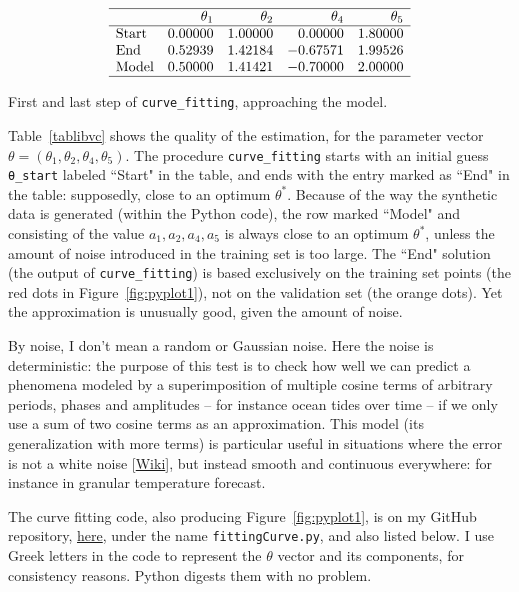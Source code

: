 \documentclass[oneside,10pt]{book}
\renewcommand{\arraystretch}{1.4} %
\begin{document}
\renewcommand{\arraystretch}{1.2} %
\begin{table}[H]
\[
\begin{array}{lrrrr}
\hline
   & \theta_1 & \theta_2  & \theta_4 & \theta_5  \\
\hline
\text{Start}	&	0.00000	&	1.00000	& 0.00000	 &  1.80000\\
\text{End}	&	0.52939	&	1.42184	&-0.67571	 &  1.99526\\
\text{Model}	&	0.50000	&	1.41421	& -0.70000	 & 2.00000  \\
\hline
\end{array}
\]
\caption{\label{tablibvc} First and last step of \texttt{curve\_fitting}, approaching the model.}
\end{table}
\renewcommand{\arraystretch}{1.0} %

Table~\ref{tablibvc} shows the quality of the estimation, for the parameter vector $\theta=(\theta_1,\theta_2,\theta_4,\theta_5)$.
The procedure \texttt{curve\_fitting} starts with an initial guess \texttt{\textcolor{gray2}{θ}\_start} labeled ``Start" in the table, and
 ends  with the entry marked as ``End" in the table: supposedly, close to an optimum $\theta^*$. Because of the way the   \textcolor{index}{synthetic data} is generated (within the Python code), the row marked ``Model" and consisting of the value
 $a_1,a_2,a_4,a_5$ is always close to an optimum $\theta^*$,
 unless the amount of noise introduced in the training set is too large. The ``End" solution (the output of
 \texttt{curve\_fitting}) is based exclusively on the training set points (the red dots
 in Figure~\ref{fig:pyplot1}), not on the \textcolor{index}{validation set} (the orange dots). Yet the approximation is unusually good, given the amount of noise.

 By noise, I don't mean a random or Gaussian noise. Here the noise is deterministic: the purpose of this test is to check how well we can predict a phenomena modeled by a superimposition of multiple cosine terms of arbitrary periods, phases and amplitudes -- for instance ocean tides over time -- if we only use a sum of two cosine terms as an approximation. This model (its generalization with more terms)  is particular useful in situations where the error is not a \textcolor{index}{white noise} [\href{https://en.wikipedia.org/wiki/White_noise}{Wiki}], but instead smooth and continuous everywhere: for instance in granular temperature forecast.

The curve fitting code, also producing Figure~\ref{fig:pyplot1}, is on my GitHub repository,
 \href{https://github.com/VincentGranville/Machine-Learning/blob/main/Source\%20Code/fittingCurve.py}{here},
 under the name \texttt{fittingCurve.py}, and also listed below. I use Greek letters in the code  to represent the $\theta$ vector and its
 components, for consistency reasons. Python digests them with no problem.  \\
\end{document}

